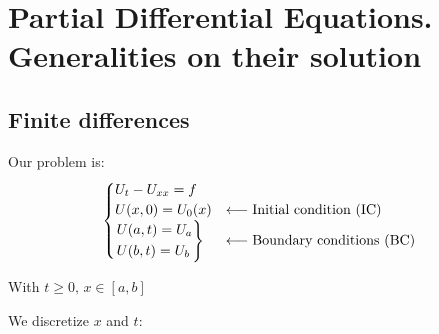 \section{Partial Differential Equations. Generalities on their solution}

\subsection{Finite differences}

\begin{example}
  Our problem is:
  \[
    \begin{cases}
      U_t - U_{xx} = f\\
      U(x,0) = U_0(x) &\longleftarrow\text{Initial condition (IC)}\\
      \begin{rcases}
        U(a,t) = U_a \\
        U(b,t) = U_b
      \end{rcases} &\longleftarrow\text{Boundary conditions (BC)}\\
    \end{cases}
  \]
  
  With $t\geq 0, \, x\in[a,b]$
\end{example}

We discretize $x$ and $t$:

